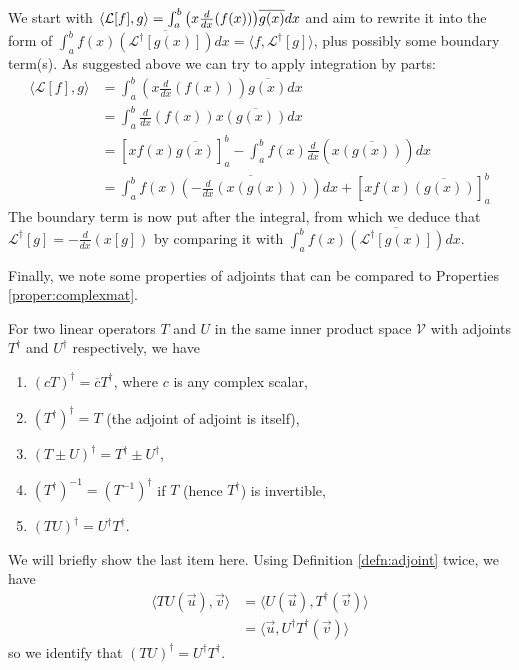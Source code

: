 \begin{solution}
We start with $\langle \mathcal{L}[f], g \rangle = \int_a^b \smash{\left(x\frac{d}{dx}(f(x))\right)} \overline{g(x)} dx$ and aim to rewrite it into the form of $\int_a^b f(x) \overline{(\mathcal{L^\dag}[g(x)])} dx = \langle f, \mathcal{L}^\dag[g] \rangle$, plus possibly some boundary term(s). As suggested above we can try to apply integration by parts:
\begin{align*}
\langle \mathcal{L}[f], g \rangle &=  \int_a^b \left(x\frac{d}{dx}(f(x))\right) \overline{g(x)} dx \\  
&= \int_a^b \frac{d}{dx}(f(x)) x\overline{(g(x))} dx \\
&= [xf(x)\overline{g(x)}]_a^b - \int_a^b f(x)\frac{d}{dx}(x\overline{(g(x))}) dx \\
&= \int_a^b f(x)\overline{\left(-\frac{d}{dx}(x(g(x)))\right)} dx + [xf(x)\overline{(g(x))}]_a^b
\end{align*}
The boundary term is now put after the integral, from which we deduce that $\mathcal{L}^\dag[g] = -\frac{d}{dx}(x[g])$ by comparing it with $\int_a^b f(x) \overline{(\mathcal{L^\dag}[g(x)])} dx$.
\end{solution}
Finally, we note some properties of adjoints that can be compared to Properties \ref{proper:complexmat}.
\begin{proper}
\label{proper:adjoints}
For two linear operators $T$ and $U$ in the same inner product space $\mathcal{V}$ with adjoints $T^\dag$ and $U^\dag$ respectively, we have
\begin{enumerate}
\item $(cT)^\dag = \overline{c}T^\dag$, where $c$ is any complex scalar,
\item $(T^\dag)^\dag = T$ (the adjoint of adjoint is itself),
\item $(T \pm U)^\dag = T^\dag \pm U^\dag$,
\item $(T^\dag)^{-1} = (T^{-1})^\dag$ if $T$ (hence $T^\dag$) is invertible,
\item $(TU)^\dag = U^\dag T^\dag$.
\end{enumerate}
\end{proper}
We will briefly show the last item here. Using Definition \ref{defn:adjoint} twice, we have
\begin{align*}
\langle TU(\vec{u}), \vec{v} \rangle &= \langle U(\vec{u}), T^\dag(\vec{v}) \rangle \\
&= \langle \vec{u}, U^\dag T^\dag(\vec{v}) \rangle
\end{align*}
so we identify that $(TU)^\dag = U^\dag T^\dag$.

